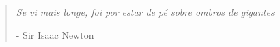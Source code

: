 
\vspace*{\fill}
\begin{quote}
	\epigraph{\textit{Se vi mais longe, foi por estar de pé sobre ombros de gigantes}}{- Sir Isaac Newton}
\end{quote}